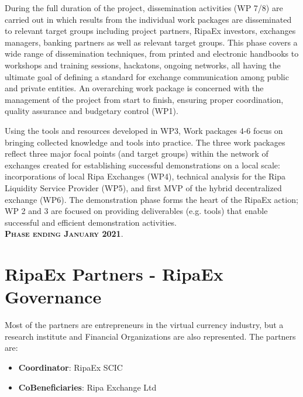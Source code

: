 \documentclass[11pt,fleqn]{book} %
\begin{document}
\begin{center}
\begin{tcolorbox}[roadmapBox,
		title=\textbf{\textsc{Dissemination (WP 7/8) and Project Coordination (WP1)}}]
		During the full duration of the project, 
		dissemination activities (WP 7/8) are carried out in which results from the individual work packages are disseminated 
		to relevant target groups including project partners, RipaEx investors, exchanges managers, banking partners as well 
		as relevant target groups. This phase covers a wide range of dissemination techniques, from printed and
		electronic handbooks to workshops and training sessions, hackatons, ongoing networks, all having the
		ultimate goal of defining a standard for exchange communication among public and private entities. 
		An overarching work package is concerned with the management of the project from start to finish, 
		ensuring proper coordination, quality assurance and budgetary control (WP1).
	\end{tcolorbox}
	\resizebox{0.05\textwidth}{26pt}{$\Downarrow$}
	\begin{tcolorbox}[roadmapBox,
		title=\textbf{\textsc{Development of hybrid-decentralized exchange (WP 4-6)}}]

		Using the tools and resources developed in WP3, 
		Work packages 4-6 focus on bringing collected knowledge and tools into practice. The three work packages reflect three major
		focal points (and target groups) within the network of exchanges created for establishing successful 
		demonstrations on a local scale: incorporations of local Ripa Exchanges (WP4), technical analysis for the 
		Ripa Liquidity Service Provider (WP5), and first MVP of the hybrid decentralized exchange (WP6). The demonstration
		phase forms the heart of the RipaEx action; WP 2 and 3 are focused on providing
		deliverables (e.g. tools) that enable successful and efficient demonstration activities.\\
		\vspace{1cm}
		\centering\textbf{\textsc{Phase ending January 2021}}.
	\end{tcolorbox}
\end{center}

\section{RipaEx Partners - RipaEx Governance}
Most of the partners are entrepreneurs in the virtual currency industry, but a research institute 
and Financial Organizations are also represented. The partners are:
\begin{itemize}
	\item \textbf{Coordinator}: RipaEx SCIC 
	\item \textbf{CoBeneficiaries}: Ripa Exchange Ltd
\end{itemize}
\end{document}

